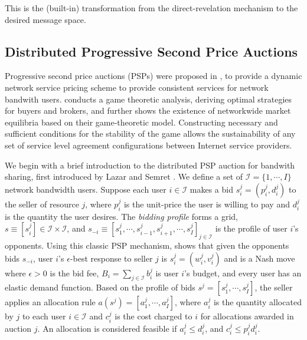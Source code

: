 \documentclass[sigconf, anonymous]{acmart}
\newcommand{\mcI}{\mathcal{I}}
\theoremstyle{definition}
\begin{document}
This is the (built-in) transformation from the
direct-revelation mechanism to the desired message space.

\subsection{Distributed Progressive Second Price Auctions}

Progressive second price auctions (PSPs) were proposed
in \cite{lazar}, \cite{diffserve} to provide a dynamic network service pricing
scheme to provide consistent services for network bandwith users.
\cite{diffserve} conducts a game theoretic analysis, deriving
optimal strategies for buyers and brokers, and further shows the existence
of networkwide market equilibria based on their game-theoretic
model. Constructing necessary and sufficient conditions for the stability
of the game allows the sustainability of any set
of service level agreement configurations between Internet service
providers.

We begin with a brief introduction to the distributed PSP auction for bandwith
sharing, first introduced by Lazar and Semret \cite{lazar}.
We define a set of $\mcI = \lbrace 1,\cdots,I\rbrace$ network bandwidth users.
Suppose each user $i \in \mcI$ makes a bid $s_i^j = (p_i^j, d_i^j)$ to the
seller of resource $j$, where $p_i^j$ is the unit-price the user is willing to
pay and $d_i^j$ is the quantity the user desires. The \emph{bidding profile} forms a grid, $s \equiv
[s_i^j] \in \mcI \times \mcI$, and $s_{-i} \equiv [s_1^j , \cdots , s_{i-1}^j , s_{i+1}^j , \cdots
, s_I^j]_{j\in\mcI}$ is the profile of user $i$'s opponents. 
Using this classic PSP mechanism, \cite{lazar} shows that given the opponents
bids $s_{-i}$,
user $i$'s $\epsilon$-best response to seller $j$ is $s_i^j = (w_i^j, v_i^j)$
and is a Nash move
where $\epsilon > 0$ is the bid fee, $B_i =\sum_{j\in\mcI} b_i^j$ is user $i$'s
budget, and every user has an elastic demand function.
Based on the profile of bids $s^j = [s^j_1, \cdots , s^j_I]$, the seller applies
an allocation rule $a(s^j) = [a_1^j, \cdots , a_I^j]$, where $a^j_i$ is the quantity allocated
by $j$ to each user $i\in\mcI$ and $c^j_i$ is the cost charged to $i$ for
allocations awarded in auction $j$. 
An allocation is considered feasible if $a^j_i \le d_i^j$, and $c^j_i \le  p^j_i d_i^j$.

\end{document}
